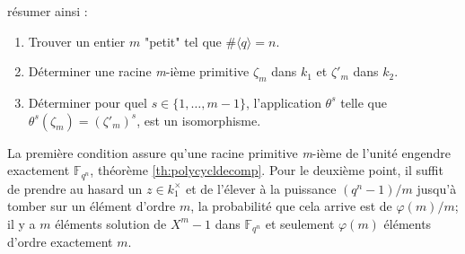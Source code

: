 \documentclass[a4paper]{article} %
\numberwithin{section}{part}
\numberwithin{equation}{section}
\newcommand\nroot[1]{\textit{#1}-ième}
\newcommand\GF[1]{\mathbb{F}_{#1}}
\newcommand\groupgen[1]{\langle{#1}\rangle}
\begin{document}
résumer ainsi :
\vspace{0.3cm}
\begin{enumerate}[1.]
    \item Trouver un entier $m$ "petit" tel que $\#\groupgen{q} = n$. 

    \item Déterminer une racine \nroot{m} primitive $\zeta_m$ dans $k_1$ et
    $\zeta'_m$ dans $k_2$.

    \item  Déterminer pour quel $s\in \lbrace{1,\dots,m-1}\rbrace$, 
    l'application $\theta^s$ telle que $\theta^s(\zeta_m) = (\zeta'_m)^s$, est 
	un isomorphisme.
\end{enumerate}
\vspace{0.3cm}
La première condition assure qu'une racine primitive \nroot{m} de l'unité 
engendre exactement $\GF{q^n}$, théorème \ref{th:polycycldecomp}. Pour le 
deuxième point, il suffit de prendre au hasard un $z\in k_1^{\times}$ et de 
l'élever à la puissance $(q^n - 1)/m$ jusqu'à tomber sur un élément d'ordre $m$,
la probabilité que cela arrive est de $\varphi(m)/m$; il y a $m$ éléments 
solution de $X^m - 1$ dans $\GF{q^n}$ et seulement $\varphi(m)$ éléments 
d'ordre exactement $m$.
\end{document}
